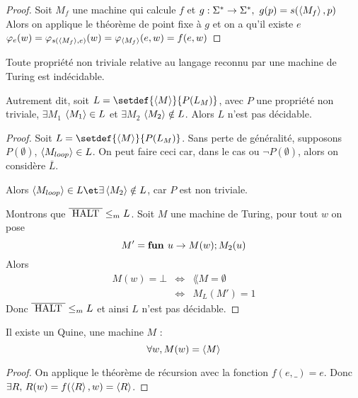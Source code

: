 \begin{proof}
	Soit $M_f$ une machine qui calcule $f$ et $g : \Sigma^{*} \to \Sigma^{*}, \ g(p) = s(\left\langle M_f\right\rangle, p)$
	Alors on applique le théorème de point fixe à $g$ et on a qu'il existe $e$ \tq $\varphi_e(w)
		=\varphi_{s(\left\langle M_f\right\rangle,e)} (w) = \varphi_{\left\langle M_f\right\rangle} (e,w) = f(e,w)$
\end{proof}


\begin{theorem}[de Rice]
	Toute propriété non triviale relative au langage reconnu par une machine de Turing est indécidable.

	Autrement dit, soit $L = \setdef {\encode M} {P(L_M)}$, avec $P$ une propriété non triviale, \ie $\exists M_1$ \tq
	$\left\langle M_1\right\rangle \in L$ et $\exists M_2$ \tq $\left\langle M_2\right\rangle \notin L$. Alors $L$ n'est pas décidable.
\end{theorem}


\begin{proof}
	Soit $L = \setdef {\encode M} {P(L_M)}$.
	Sans perte de généralité, supposons $P(\emptyset)$, \ie $\left\langle M_{loop}\right\rangle \in L$.
	On peut faire ceci car, dans le cas ou $\lnot P (\emptyset)$, alors on considère $\bar L$.

	Alors $\encode {M_{loop}} \in L \et \exists \encode{M_2} \notin L$, car $P$ est non triviale.

	Montrons que $\overline {\text{ HALT }} \leq_m L$.
	Soit $M$ une machine de Turing, pour tout $w$ on pose
	$$M' = \textbf{fun } u \rightarrow M(w); M_2(u)$$
	Alors
	\begin{eqnarray*}
		M(w) = \bot &\iff& \lang M = \emptyset \\
		&\iff& M_L (M') = 1
	\end{eqnarray*}
	Donc $\overline {\text{ HALT }} \leq_m L$ et ainsi $L$ n'est pas décidable.
\end{proof}



\begin{prop}
	Il existe un Quine, \ie une machine $M$ \tq :
	$$\forall w, M(w) = \left\langle M\right\rangle$$
\end{prop}

\begin{proof}
	On applique le théorème de récursion avec la fonction $f(e, \_) = e$. Donc $\exists R, \, R(w) = f(\left\langle R\right\rangle, w) = \left\langle R\right\rangle$.
\end{proof}

